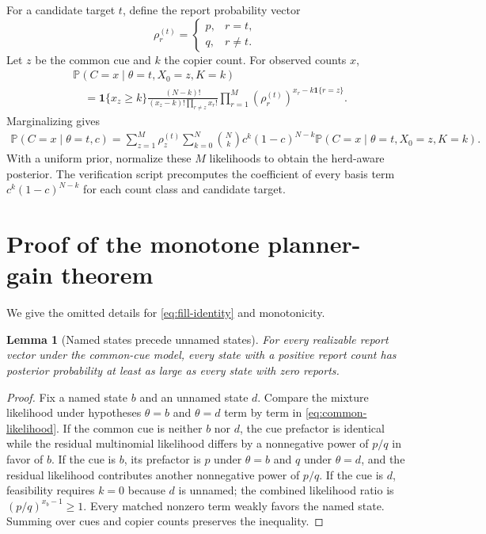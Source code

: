 \documentclass[11pt]{article}
\newtheorem{lemma}{Lemma}
\theoremstyle{definition}
\theoremstyle{remark}
\newcommand{\Prob}{\mathbb{P}}
\newcommand{\1}{\mathbf{1}}
\begin{document}
For a candidate target $t$, define the report probability vector
\[
\rho_r^{(t)}=
\begin{cases}
p,&r=t,\\q,&r\neq t.
\end{cases}
\]
Let $z$ be the common cue and $k$ the copier count. For observed counts $x$,
\begin{align}
&\Prob(C=x\mid\theta=t,X_0=z,K=k)\\
&\quad=
\1\{x_z\ge k\}
\frac{(N-k)!}{(x_z-k)!\prod_{r\neq z}x_r!}
\prod_{r=1}^M\left(\rho_r^{(t)}\right)^{x_r-k\1\{r=z\}}.
\end{align}
Marginalizing gives
\begin{align}
\Prob(C=x\mid\theta=t,c)
=\sum_{z=1}^M\rho_z^{(t)}
\sum_{k=0}^N\binom Nk c^k(1-c)^{N-k}
\Prob(C=x\mid\theta=t,X_0=z,K=k).
\label{eq:common-likelihood}
\end{align}
With a uniform prior, normalize these $M$ likelihoods to obtain the herd-aware posterior. The verification script precomputes the coefficient of every basis term $c^k(1-c)^{N-k}$ for each count class and candidate target.

\section{Proof of the monotone planner-gain theorem}
\label{app:planner-proof}

We give the omitted details for \cref{eq:fill-identity} and monotonicity.

\begin{lemma}[Named states precede unnamed states]
For every realizable report vector under the common-cue model, every state with a positive report count has posterior probability at least as large as every state with zero reports.
\end{lemma}

\begin{proof}
Fix a named state $b$ and an unnamed state $d$. Compare the mixture likelihood under hypotheses $\theta=b$ and $\theta=d$ term by term in \cref{eq:common-likelihood}. If the common cue is neither $b$ nor $d$, the cue prefactor is identical while the residual multinomial likelihood differs by a nonnegative power of $p/q$ in favor of $b$. If the cue is $b$, its prefactor is $p$ under $\theta=b$ and $q$ under $\theta=d$, and the residual likelihood contributes another nonnegative power of $p/q$. If the cue is $d$, feasibility requires $k=0$ because $d$ is unnamed; the combined likelihood ratio is $(p/q)^{x_b-1}\ge1$. Every matched nonzero term weakly favors the named state. Summing over cues and copier counts preserves the inequality.
\end{proof}
\end{document}
